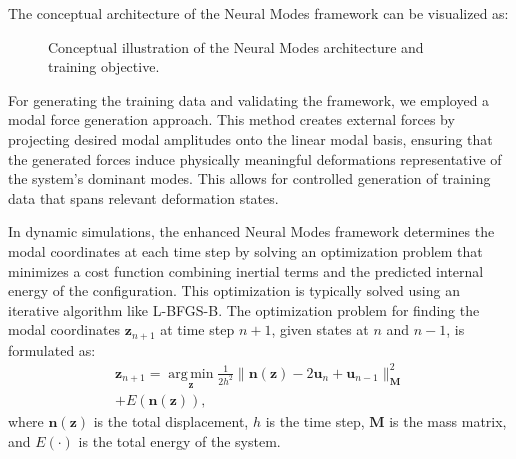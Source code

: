 \documentclass[11pt,a4paper,twocolumn]{article}
\DeclareMathOperator*{\argmin}{arg\,min}
\begin{document}
The conceptual architecture of the Neural Modes framework can be visualized as:

\begin{figure}[H]
    \centering
    \caption{Conceptual illustration of the Neural Modes architecture and training objective.}
    \label{fig:neural_modes_arch_es}
\end{figure}

For generating the training data and validating the framework, we employed a modal force generation approach. This method creates external forces by projecting desired modal amplitudes onto the linear modal basis, ensuring that the generated forces induce physically meaningful deformations representative of the system's dominant modes. This allows for controlled generation of training data that spans relevant deformation states.

In dynamic simulations, the enhanced Neural Modes framework determines the modal coordinates at each time step by solving an optimization problem that minimizes a cost function combining inertial terms and the predicted internal energy of the configuration. This optimization is typically solved using an iterative algorithm like L-BFGS-B. The optimization problem for finding the modal coordinates $\bm{z}_{n+1}$ at time step $n+1$, given states at $n$ and $n-1$, is formulated as:
\begin{equation}
\begin{split}
        \bm{z}_{n+1} = \underset{\bm{z}}{\argmin} \frac{1}{2h^2} \|\bm{n}(\bm{z}) - 2\bm{u}_n + \bm{u}_{n-1}\|_{\bm{M}}^2 \\+ E(\bm{n}(\bm{z})),
\end{split}
    \label{eq:optimization_problem_es}
\end{equation}
where $\bm{n}(\bm{z})$ is the total displacement, $h$ is the time step, $\bm{M}$ is the mass matrix, and $E(\cdot)$ is the total energy of the system. 
\end{document}
